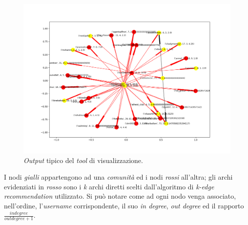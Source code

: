 \begin{figure}
\begin{center}
\includegraphics[scale=0.5]{images/beefban_in_degree_probability_free.png}
\end{center}
\caption{\textit{Output} tipico del \textit{tool} di visualizzazione.}
\label{fig:tool}
\end{figure}
I nodi \textit{gialli} appartengono ad una \textit{comunità} ed i nodi \textit{rossi} all'altra; gli archi evidenziati in \textit{rosso} sono i \textit{k} archi diretti scelti dall'algoritmo di \textit{k-edge recommendation} utilizzato. Si può notare come ad ogni nodo venga associato, nell'ordine, l'\textit{username} corrispondente, il suo \textit{in degree}, \textit{out degree} ed il rapporto $\frac{in degree}{out degree + 1}$.


